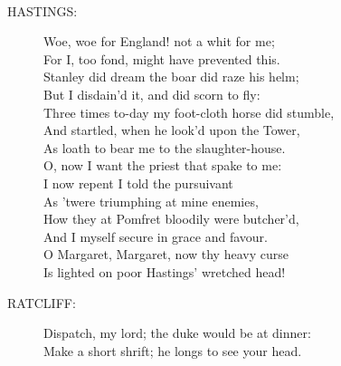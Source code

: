 \documentclass{article}
\begin{document}
\\
\begin{description}
\item[HASTINGS:] 
\hspace{1pt}Woe, woe for England! not a whit for me;\\
\hspace{1pt}For I, too fond, might have prevented this.\\
\hspace{1pt}Stanley did dream the boar did raze his helm;\\
\hspace{1pt}But I disdain'd it, and did scorn to fly:\\
\hspace{1pt}Three times to-day my foot-cloth horse did stumble,\\
\hspace{1pt}And startled, when he look'd upon the Tower,\\
\hspace{1pt}As loath to bear me to the slaughter-house.\\
\hspace{1pt}O, now I want the priest that spake to me:\\
\hspace{1pt}I now repent I told the pursuivant\\
\hspace{1pt}As 'twere triumphing at mine enemies,\\
\hspace{1pt}How they at Pomfret bloodily were butcher'd,\\
\hspace{1pt}And I myself secure in grace and favour.\\
\hspace{1pt}O Margaret, Margaret, now thy heavy curse\\
\hspace{1pt}Is lighted on poor Hastings' wretched head!\\
\end{description}
\begin{description}
\item[RATCLIFF:] 
\hspace{1pt}Dispatch, my lord; the duke would be at dinner:\\
\hspace{1pt}Make a short shrift; he longs to see your head.\\
\end{description}
\end{document}
